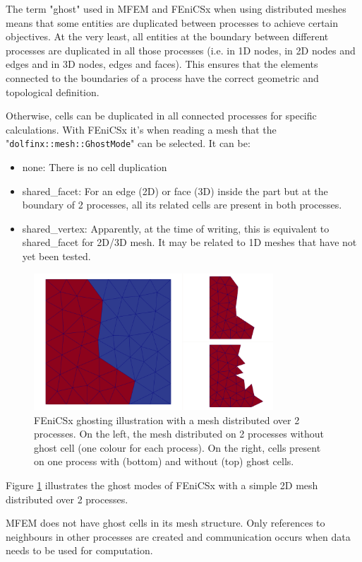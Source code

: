 \documentclass[12pt]{article}
\newcommand{\f}[1]{FEniCSx#1}
\newcommand{\mycode}[1]{\textsf{"}\lstinline`#1`\textsf{"}}
\begin{document}
 
 The term "ghost" used in MFEM and \f{} when using distributed meshes means that some entities are duplicated between processes to achieve certain objectives.
 At the very least, all entities at the boundary between different processes are duplicated in all those processes (i.e. in 1D nodes, in 2D nodes and edges and in 3D nodes, edges and faces). This ensures that the elements connected to the boundaries of a process have the correct geometric and topological definition. 
 
 Otherwise, cells can be duplicated in all connected processes for specific calculations.
 With \f{} it's when  reading a mesh that the \mycode{dolfinx::mesh::GhostMode} can be selected. It can be:
 \begin{itemize}
 	\item none: There is no cell duplication
 	\item shared\_facet:   For an edge (2D) or face (3D) inside the part but at the boundary of 2 processes, all its related cells are present in both processes.
 	\item shared\_vertex: Apparently, at the time of writing, this is equivalent to shared\_facet for 2D/3D mesh. It may be related to 1D meshes that have not yet been tested. 
 \end{itemize}
 \begin{figure}
	\centering
	\includegraphics[width=0.8\textwidth]{ghost.png}
	\caption{\f{} ghosting illustration with a mesh distributed over 2 processes. On the left, the mesh distributed on 2 processes without ghost cell (one colour for each process). On the right, cells present on one process with (bottom) and without (top) ghost cells. \label{ghost}}
\end{figure}
Figure \ref{ghost} illustrates the ghost modes of \f{} with a simple 2D mesh distributed over 2 processes.
 

MFEM does not have ghost cells in its mesh structure. Only references to neighbours in other processes are created and communication occurs when data needs to be used for computation.
\end{document}
